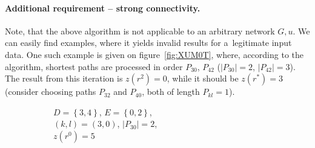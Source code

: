 \documentclass[paper=a4,parskip=half,DIV=12]{leetcode}
\begin{document}
\paragraph{Additional requirement -- strong connectivity.}

Note, that the above algorithm is not applicable to an arbitrary network $G,
u$. We can easily find examples, where it yields invalid results for
a~legitimate input data. One such example is given on figure~\ref{fig:XUM0T},
where, according to the algorithm, shortest paths are processed in order
$P_{30}$, $P_{42}$ ($|P_{30}| = 2$, $|P_{42}| = 3$). The result from this
iteration is $z(r^2) = 0$, while it should be $z(r^{*}) = 3$ (consider choosing
paths $P_{32}$ and $P_{40}$, both of length $P_{kl} = 1$).
\begin{figure}[H]
  \centering
  \begin{subfigure}[t]{0.33\textwidth}
    \centering
    \caption{$D=\left\lbrace 3,4 \right\rbrace$,
             $E=\left\lbrace 0,2 \right\rbrace$, \\
             $(k,l)=(3,0)$, $|P_{30}| = 2$, \\
             $z(r^0) = 5$}
  \end{subfigure}
  \begin{subfigure}[t]{0.33\textwidth}
    \centering
\end{subfigure}
\end{figure}
\end{document}
